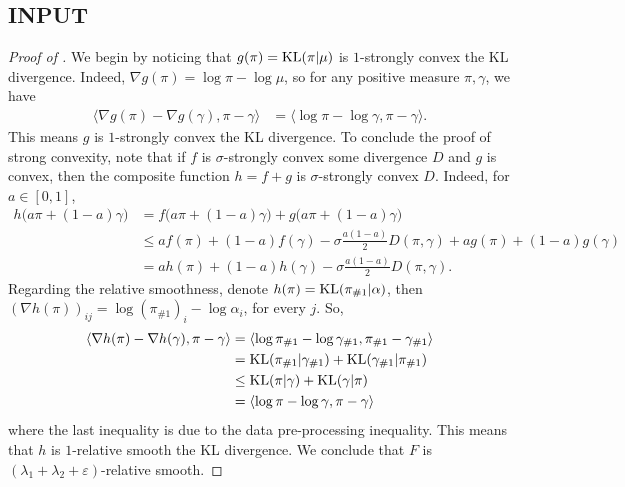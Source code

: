 \subsection{INPUT}
\begin{proof}[Proof of ]
We begin by noticing that $g(\pi) = \text{KL}(\pi | \mu)$ is $1$-strongly convex \wrt the KL divergence.
Indeed, $\nabla g(\pi) = \log \pi - \log \mu$, so for any positive measure $\pi, \gamma$, we have
\begin{align*}
    \langle \nabla g(\pi) - \nabla g(\gamma), \pi - \gamma \rangle
    &= \langle
    \log \pi - \log \gamma, \pi - \gamma \rangle.
\end{align*}
This means $g$ is $1$-strongly convex \wrt the KL divergence.
To conclude the proof of strong convexity, note that if $f$ is $\sigma$-strongly convex \wrt
some divergence $D$ and $g$ is convex, then the composite function $h = f + g$ is
$\sigma$-strongly convex \wrt $D$. Indeed, for $a \in [0,1]$,
\begin{align*}
    h \big( a \pi + (1-a) \gamma \big)
    &= f \big( a \pi + (1-a) \gamma \big) + g \big( a \pi + (1-a) \gamma \big) \\
    &\leq a f(\pi) + (1 - a) f(\gamma) - \sigma \frac{a (1 - a)}{2} D(\pi, \gamma)
    + a g(\pi) + (1 - a) g(\gamma) \\
    &= a h(\pi) + (1 - a) h(\gamma) - \sigma \frac{a (1 - a)}{2} D(\pi, \gamma).
\end{align*}
Regarding the relative smoothness, denote $h(\pi) = \text{KL}(\pi_{\#1} | \alpha)$,
then $(\nabla h(\pi))_{ij} = \log (\pi_{\#1})_i - \log \alpha_i$, for every $j$. So,
\begin{equation}
    \begin{split}
        \langle \nabla h(\pi) - \nabla h(\gamma), \pi - \gamma \rangle
    &= \langle
    \log \pi_{\# 1} - \log \gamma_{\# 1}, \pi_{\# 1} - \gamma_{\# 1} \rangle\\
    &= \text{KL}(\pi_{\# 1} | \gamma_{\# 1}) + \text{KL}(\gamma_{\# 1} | \pi_{\# 1}) \\
    &\leq \text{KL}(\pi | \gamma) + \text{KL}(\gamma | \pi) \\
    &= \langle \log \pi - \log \gamma, \pi - \gamma \rangle
    \end{split}
\end{equation}
where the last inequality is due to the data pre-processing inequality.
This means that $h$ is $1$-relative smooth \wrt the KL divergence.
We conclude that $F$ is $(\lambda_1 + \lambda_2 + \varepsilon)$-relative smooth.
\end{proof}

